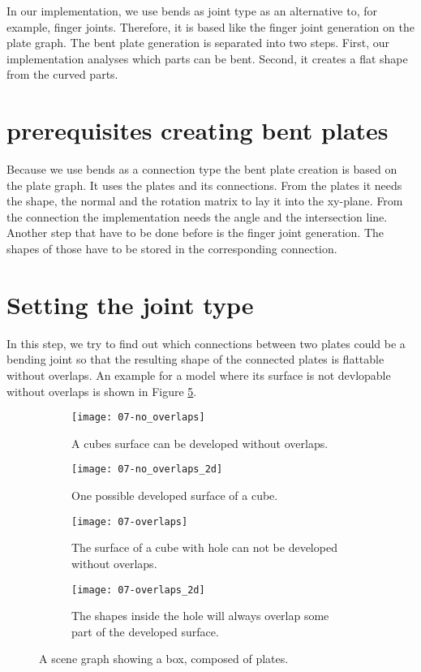 \documentclass[../ClassicThesis.tex]{subfiles}
\begin{document}
In our implementation, we use bends as joint type as an alternative to, for example, finger joints. Therefore, it is based like the finger joint generation on the plate graph. The bent plate generation is separated into two steps. First, our implementation analyses which parts can be bent. Second, it creates a flat shape from the curved parts.

\section{prerequisites creating bent plates}

Because we use bends as a connection type the bent plate creation is based on the plate graph. It uses the plates and its connections. From the plates it needs the shape, the normal and the rotation matrix to lay it into the xy-plane. From the connection the implementation needs the angle and the intersection line. Another step that have to be done before is the finger joint generation. The shapes of those have to be stored in the corresponding connection.

\section{Setting the joint type}

In this step, we try to find out which connections between two plates could be a bending joint so that the resulting shape of the connected plates is flattable without overlaps. An example for a model where its surface is not devlopable without overlaps is shown in Figure \ref{fig:overlaps}.

\begin{figure}[h]
  \centering
  \begin{subfigure}[b]{0.49\textwidth}
    \centering
    \texttt{[image: 07-no\_overlaps]}
    \caption{A cubes surface can be developed without overlaps.}
    \label{fig:overlaps:no-3d}
  \end{subfigure}
  \begin{subfigure}[b]{0.49\textwidth}
    \centering
    \texttt{[image: 07-no\_overlaps\_2d]}
    \caption{One possible developed surface of a cube.}
    \label{fig:overlapsh:no-2d}
  \end{subfigure}
  \begin{subfigure}[b]{0.49\textwidth}
    \centering
    \texttt{[image: 07-overlaps]}
    \caption{The surface of a cube with hole can not be developed without overlaps.}
    \label{fig:overlaps:some-3d}
  \end{subfigure}
  \begin{subfigure}[b]{0.49\textwidth}
    \centering
    \texttt{[image: 07-overlaps\_2d]}
    \caption{The shapes inside the hole will always overlap some part of the developed surface.}
    \label{fig:overlaps:some-2d}
  \end{subfigure}
  \caption{A scene graph showing a box, composed of plates.}
  \label{fig:overlaps}
\end{figure}
\end{document}

